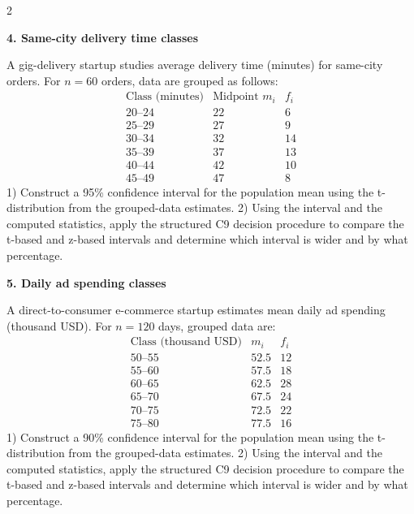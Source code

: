 \documentclass[12pt]{article}
\newcommand{\SubsectionBox}[1]{%
\noindent\colorbox{gray!30}{%
\parbox{\dimexpr\linewidth-2\fboxsep\relax}{\textbf{#1}}%
}\par\vspace{0.35cm}%
}
\begin{document}
\begin{multicols}{2}
		\vspace{0.25cm}
		\SubsectionBox{4. Same-city delivery time classes}\vspace{-0.25cm}
		A gig-delivery startup studies average delivery time (minutes) for same-city orders.
		For $n=60$ orders, data are grouped as follows:
		\[
		\begin{array}{c|c|c}
		\text{Class (minutes)} & \text{Midpoint }m_i & f_i\\\hline
		20\text{--}24 & 22 & 6\\
		25\text{--}29 & 27 & 9\\
		30\text{--}34 & 32 & 14\\
		35\text{--}39 & 37 & 13\\
		40\text{--}44 & 42 & 10\\
		45\text{--}49 & 47 & 8
		\end{array}
		\]
		1) Construct a 95\% confidence interval for the population mean using the t-distribution from the grouped-data estimates.
		2) Using the interval and the computed statistics, apply the structured C9 decision procedure to compare the t-based and z-based intervals and determine which interval is wider and by what percentage.
		
		\vspace{0.25cm}
		\SubsectionBox{5. Daily ad spending classes}\vspace{-0.25cm}
		A direct-to-consumer e-commerce startup estimates mean daily ad spending (thousand USD).
		For $n=120$ days, grouped data are:
		\[
		\begin{array}{c|c|c}
		\text{Class (thousand USD)} & m_i & f_i\\\hline
		50\text{--}55 & 52.5 & 12\\
		55\text{--}60 & 57.5 & 18\\
		60\text{--}65 & 62.5 & 28\\
		65\text{--}70 & 67.5 & 24\\
		70\text{--}75 & 72.5 & 22\\
		75\text{--}80 & 77.5 & 16
		\end{array}
		\]
		1) Construct a 90\% confidence interval for the population mean using the t-distribution from the grouped-data estimates.
		2) Using the interval and the computed statistics, apply the structured C9 decision procedure to compare the t-based and z-based intervals and determine which interval is wider and by what percentage.
		

\end{multicols}
\end{document}
